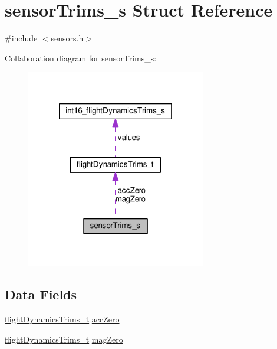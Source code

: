 \hypertarget{structsensorTrims__s}{\section{sensor\+Trims\+\_\+s Struct Reference}
\label{structsensorTrims__s}
}


{\ttfamily \#include $<$sensors.\+h$>$}



Collaboration diagram for sensor\+Trims\+\_\+s\+:\nopagebreak
\begin{figure}[H]
\begin{center}
\leavevmode
\includegraphics[width=222pt]{structsensorTrims__s__coll__graph}
\end{center}
\end{figure}
\subsection*{Data Fields}
\begin{DoxyCompactItemize}
\item 
\hyperlink{unionflightDynamicsTrims__t}{flight\+Dynamics\+Trims\+\_\+t} \hyperlink{structsensorTrims__s_ae2ff01979c78eba7fb34e839f889c1cb}{acc\+Zero}
\item 
\hyperlink{unionflightDynamicsTrims__t}{flight\+Dynamics\+Trims\+\_\+t} \hyperlink{structsensorTrims__s_a7129fe36faf02634bf951658b572dac6}{mag\+Zero}
\end{DoxyCompactItemize}


